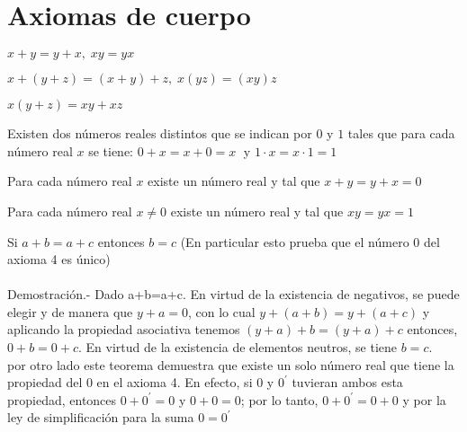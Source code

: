 \section*{Axiomas de cuerpo}
\begin{tcolorbox}[colback=white]
\begin{axioma} $x+y=y+x, \; xy=yx$\\
\end{axioma}

\begin{axioma} $x+(y+z)=(x+y)+z, \; x(yz)=(xy)z$ \\
\end{axioma}

\begin{axioma} $x(y+z)=xy+xz$ \\
\end{axioma}

\begin{axioma} Existen dos números reales distintos que se indican por $0$ y $1$ tales que para cada número real $x$ se tiene:
$0+x=x+0=x \;$ y $1\cdot x = x\cdot 1 = 1$ \\
\end{axioma}

\begin{axioma} Para cada número real $x$ existe un número real y tal que $x+y=y+x=0$ \\
\end{axioma}

\begin{axioma} Para cada número real $x\neq 0$ existe un número real y tal que $xy=yx=1$ \\
\end{axioma}
\end{tcolorbox}

\begin{teo}
Si $a+b=a+c$ entonces $b=c$ (En particular esto prueba que el número 0 del axioma 4 es único)\\\\
Demostración.- \;
Dado a+b=a+c. En virtud de la existencia de negativos, se puede elegir y de manera que $y+a=0$, con lo cual $y+(a+b)=y+(a+c)$ y aplicando la propiedad asociativa tenemos $(y+a)+b=(y+a)+c$ entonces, $0+b=0+c$. En virtud de la existencia de elementos neutros, se tiene $b=c$.\\
por otro lado este teorema demuestra que existe un solo número real que tiene la propiedad del 0 en el axioma 4. En efecto, si $0$ y $0^{'}$ tuvieran ambos esta propiedad, entonces $0+0^{'}=0$ y $0+0=0$; por lo tanto, $0+0^{'}=0+0$ y por la ley de simplificación para la suma $0=0^{'}$\\\\
\end{teo}

